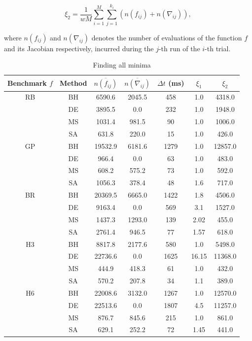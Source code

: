 \begin{equation}\label{eq:metric2}
\xi_2 = \frac{1}{wM}\sum_{i=1}^M \sum_{j=1}^{k_i} \left( n(f_{ij}) + n(\nabla_{ij}) \right),
\end{equation}

where $n(f_{ij})$ and $n(\nabla_{ij})$ denotes the number of evaluations of the function $f$ and its Jacobian respectively,
incurred during the $j$-th run of the $i$-th trial.

\begin{table}
    \center
    \caption{Finding all minima}
    \label{table:compare-all}
    \footnotesize
    \begin{tabular}{cc|ccccc}
        Benchmark $f$ & Method & $\overline{n(f_{ij})}$ & $\overline{n(\nabla_{ij})}$ & $\Delta t$ (ms) & $\xi_1$ & $\xi_2$  \\
        \hline
RB  & BH & 6590.6 & 2045.5 & 458 & 1.0 & 4318.0 \\
 & DE & 3895.5 & 0.0 & 232 & 1.0 & 1948.0 \\
 & MS & 1031.4 & 981.5 & 90 & 1.0 & 1006.0 \\
 & SA & 631.8 & 220.0 & 15 & 1.0 & 426.0 \\
\hline
GP  & BH & 19532.9 & 6181.6 & 1279 & 1.0 & 12857.0 \\
 & DE & 966.4 & 0.0 & 63 & 1.0 & 483.0 \\
 & MS & 608.2 & 575.2 & 73 & 1.0 & 592.0 \\
 & SA & 1056.3 & 378.4 & 48 & 1.6 & 717.0 \\
\hline
BR  & BH & 20369.5 & 6665.0 & 1422 & 1.8 & 4506.0 \\
 & DE & 9163.4 & 0.0 & 569 & 3.1 & 1527.0 \\
 & MS & 1437.3 & 1293.0 & 139 & 2.02 & 455.0 \\
 & SA & 2761.4 & 946.5 & 77 & 1.57 & 618.0 \\
\hline
H3  & BH & 8817.8 & 2177.6 & 580 & 1.0 & 5498.0 \\
 & DE & 22736.6 & 0.0 & 1625 & 16.15 & 11368.0 \\
 & MS & 444.9 & 418.3 & 61 & 1.0 & 432.0 \\
 & SA & 570.2 & 207.8 & 34 & 1.1 & 389.0 \\
\hline
H6  & BH & 22008.6 & 3132.0 & 1267 & 1.0 & 12570.0 \\
 & DE & 22513.6 & 0.0 & 1807 & 4.5 & 11257.0 \\
 & MS & 876.7 & 845.6 & 215 & 1.0 & 861.0 \\
 & SA & 629.1 & 252.2 & 72 & 1.45 & 441.0 \\
    \end{tabular}
\end{table}

